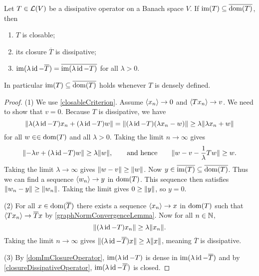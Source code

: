 \begin{proposition} \label{dissipativeOperatorClosable}
Let $T\in \operatorname{\mathcal{L}}(V)$ be a dissipative operator on a Banach space $V$. If $\operatorname{im}(T)\subseteq \overline{\operatorname{dom}(T)}$, then
\begin{enumerate}
\item $T$ is closable;
\item its closure $\overline{T}$ is dissipative;
\item $\operatorname{im}(\lambda\operatorname{id} - \overline{T}) = \overline{\operatorname{im}(\lambda\operatorname{id} - T)}$ for all $\lambda >0$.
\end{enumerate}
\end{proposition}
In particular $\operatorname{im}(T)\subseteq \overline{\operatorname{dom}(T)}$ holds whenever $T$ is densely defined.
\begin{proof}
(1) We use \ref{closableCriterion}. Assume $\left\langle x_n \right\rangle\to 0$ and $\left\langle Tx_n \right\rangle\to v$. We need to show that $v=0$. Because $T$ is dissipative, we have
\[ \lVert\lambda(\lambda\operatorname{id}-T)x_n + (\lambda\operatorname{id}-T)w\rVert = \lVert(\lambda\operatorname{id}-T)(\lambda x_n -w)\rVert \geq \lambda\lVert\lambda x_n + w\rVert \]
for all $w\in \in\operatorname{dom}(T)$ and all $\lambda>0$. Taking the limit $n\to \infty$ gives
\[ \lVert-\lambda v +(\lambda\operatorname{id}- T)w\rVert \geq \lambda\lVert w\rVert, \qquad\text{and hence}\qquad \lVert w - v - \frac{1}{\lambda}Tw\rVert \geq w. \]
Taking the limit $\lambda \to \infty$ gives $\lVert w-v\rVert\geq \lVert w\rVert$. Now $y\in \overline{\operatorname{im}(T)} \subseteq \overline{\operatorname{dom}(T)}$. Thus we can find a sequence $\left\langle w_n \right\rangle\to y$ in $\operatorname{dom}(T)$. This sequence then satisfies $\lVert w_n-y\rVert \geq \lVert w_n\rVert$. Taking the limit gives $0\geq \lVert y\rVert$, so $y = 0$.

(2) For all $x\in\operatorname{dom}(\overline{T})$ there exists a sequence $\left\langle x_n \right\rangle\to x$ in $\operatorname{dom}(T)$ such that $\left\langle Tx_n \right\rangle \to \overline{T}x$ by \ref{graphNormConvergenceLemma}. Now for all $n\in \mathbb{N}$,
\[ \lVert(\lambda\operatorname{id}-T)x_n\rVert \geq \lambda\lVert x_n\rVert. \]
Taking the limit $n\to\infty$ gives $\lVert(\lambda\operatorname{id}-\overline{T})x\rVert \geq \lambda\lVert x\rVert$, meaning $\overline{T}$ is dissipative.

(3) By \ref{domImClosureOperator}, $\operatorname{im}(\lambda\operatorname{id} - T)$ is dense in $\operatorname{im}(\lambda\operatorname{id}-\overline{T})$ and by \ref{closureDissipativeOperator}, $\operatorname{im}(\lambda\operatorname{id}-\overline{T})$ is closed.
\end{proof}

